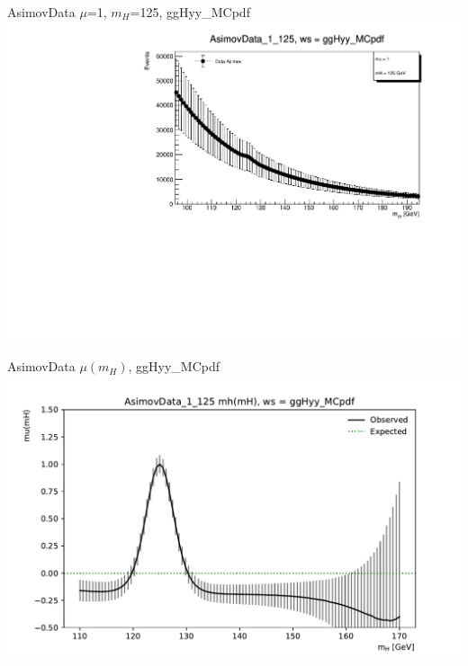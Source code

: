 \documentclass[10pt,UKenglish, leqno, xcolor = dvipsnames]{beamer}
\begin{document}
		\begin{frame}{AsimovData $\mu$=1, $m_H$=125, ggHyy\_MCpdf}
			\vfill
			\includegraphics[width=1.\textwidth]{../images/AsimovData_1_125_ggHyy_MCpdf.pdf}
			\vfill
		\end{frame}
	
		\begin{frame}{AsimovData $\mu(m_H)$, ggHyy\_MCpdf}
			\vfill
			\includegraphics[width=1.\textwidth]{../images/mu_AsimovData_1_125_ggHyy_MCpdf_plot.pdf}
			\vfill
		\end{frame}
	
\end{document}
